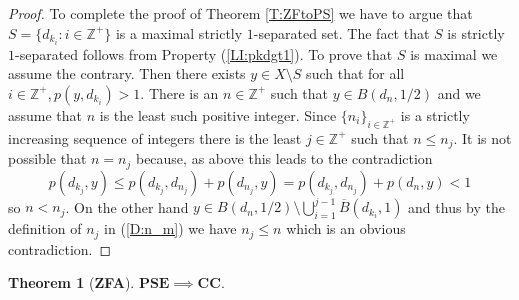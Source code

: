 \documentclass[11pt, reqno]{amsart}
\theoremstyle{definition}
\newtheorem{theorem}{Theorem}
\numberwithin{theorem}{section}
\theoremstyle{definition}
\theoremstyle{definition}
\theoremstyle{definition}
\theoremstyle{definition}
\theoremstyle{definition}
\numberwithin{claim}{section}
\theoremstyle{definition}
\theoremstyle{definition}
\theoremstyle{definition}
\theoremstyle{definition}
\theoremstyle{definition}
\theoremstyle{remboldstyle}
\begin{document}
\begin{proof}
To complete the proof of Theorem \ref{T:ZFtoPS} we have to argue that $S = \{ d_{k_i} : i \in \mathbb{Z}^+ \}$ is a maximal strictly $1$-separated set.  The fact that $S$ is strictly $1$-separated follows from Property (\ref{LI:pkdgt1}). To prove that 
 $S$ is maximal we assume the contrary.  Then there exists $y \in X\setminus S$ such that for all $i \in \mathbb{Z}^{+}, p(y,d_{k_i}) > 1$.  There is an $n \in \mathbb{Z}^+$ such that $y \in B(d_n, 1/2)$ and we assume that $n$ is the least such positive integer.  Since $\{ n_i \}_{i \in \mathbb{Z}^+}$ is a strictly increasing sequence of integers there is the least $j \in \mathbb{Z}^+$ such that $n \le n_j$.  It is not possible that $n = n_j$ because, as above this leads to the contradiction 
\[
p(d_{k_j}, y) \le p(d_{k_j}, d_{n_j}) + p(d_{n_j}, y) = p(d_{k_j}, d_{n_j}) + p(d_{n}, y) < 1
\]
so $n < n_j$.  On the other hand $y \in B(d_n, 1/2) \setminus \bigcup_{i=1}^{j-1}\overline{B}(d_{k_i}, 1)$ and thus by the definition of $n_j$ in (\ref{D:n_m}) we have $n_j \le n$ which is an obvious contradiction.
\end{proof}

\begin{theorem}[\textbf{ZFA}]
\label{T:ExtensionOfDeltaSep}
$\mathbf{PSE} \implies \mathbf{CC}$.
\end{theorem}
\end{document}
